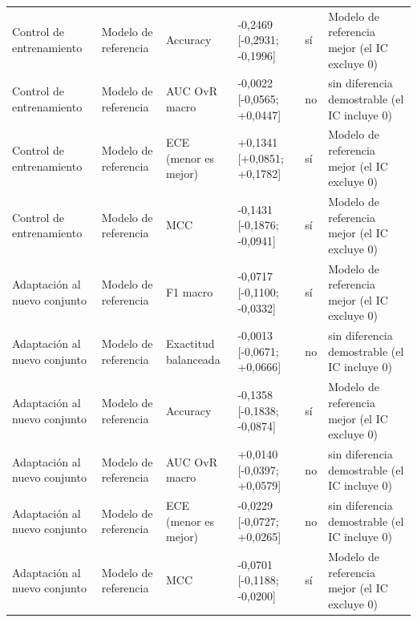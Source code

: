 \begin{longtable}{@{}llllll@{}}
Control de entrenamiento & Modelo de referencia & Accuracy & -0,2469 [-0,2931; -0,1996] & sí & Modelo de referencia mejor (el IC excluye 0) \\
Control de entrenamiento & Modelo de referencia & AUC OvR macro & -0,0022 [-0,0565; +0,0447] & no & sin diferencia demostrable (el IC incluye 0) \\
Control de entrenamiento & Modelo de referencia & ECE (menor es mejor) & +0,1341 [+0,0851; +0,1782] & sí & Modelo de referencia mejor (el IC excluye 0) \\
Control de entrenamiento & Modelo de referencia & MCC & -0,1431 [-0,1876; -0,0941] & sí & Modelo de referencia mejor (el IC excluye 0) \\
Adaptación al nuevo conjunto & Modelo de referencia & F1 macro & -0,0717 [-0,1100; -0,0332] & sí & Modelo de referencia mejor (el IC excluye 0) \\
Adaptación al nuevo conjunto & Modelo de referencia & Exactitud balanceada & -0,0013 [-0,0671; +0,0666] & no & sin diferencia demostrable (el IC incluye 0) \\
Adaptación al nuevo conjunto & Modelo de referencia & Accuracy & -0,1358 [-0,1838; -0,0874] & sí & Modelo de referencia mejor (el IC excluye 0) \\
Adaptación al nuevo conjunto & Modelo de referencia & AUC OvR macro & +0,0140 [-0,0397; +0,0579] & no & sin diferencia demostrable (el IC incluye 0) \\
Adaptación al nuevo conjunto & Modelo de referencia & ECE (menor es mejor) & -0,0229 [-0,0727; +0,0265] & no & sin diferencia demostrable (el IC incluye 0) \\
Adaptación al nuevo conjunto & Modelo de referencia & MCC & -0,0701 [-0,1188; -0,0200] & sí & Modelo de referencia mejor (el IC excluye 0) \\
\bottomrule
\end{longtable}
\endgroup

